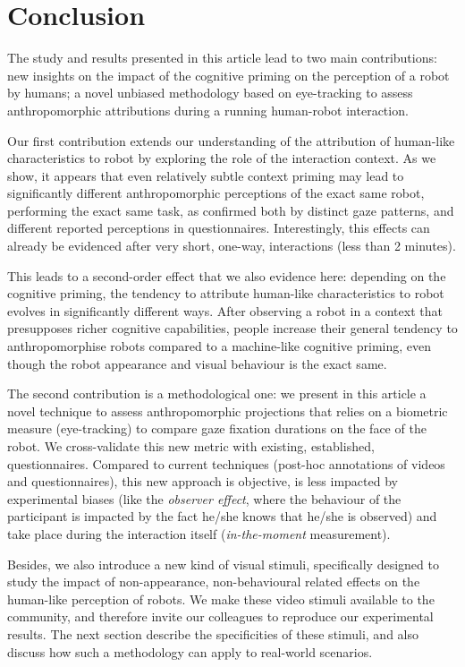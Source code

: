 \documentclass[lettersize, noapacite, twoside, HRI]{apa_HRI}
\begin{document}
\section{Conclusion}

The study and results presented in this article lead to two main contributions:
new insights on the impact of the cognitive priming on the perception of a robot
by humans; a novel unbiased methodology based on eye-tracking to assess
anthropomorphic attributions during a running human-robot interaction.

Our first contribution extends our understanding of the attribution of
human-like characteristics to robot by exploring the role of the interaction
context. As we show, it appears that even relatively subtle context
priming may lead to significantly different anthropomorphic perceptions of
the exact same robot, performing the exact same task, as confirmed both by
distinct gaze patterns, and different reported perceptions in questionnaires.
Interestingly, this effects can already be evidenced after very short,
one-way, interactions (less than 2 minutes).

This leads to a second-order effect that we also evidence here: depending on the
cognitive priming, the tendency to attribute human-like characteristics to robot
evolves in significantly different ways. After observing a robot in a
context that presupposes richer cognitive capabilities, people increase
their general tendency to anthropomorphise robots compared to a machine-like
cognitive priming, even though the robot appearance and visual behaviour is the
exact same.

The second contribution is a methodological one: we present in this article
a novel technique to assess anthropomorphic projections that relies on a
biometric measure (eye-tracking) to compare gaze fixation durations on
the face of the robot. We cross-validate this new metric with existing,
established, questionnaires. Compared to current techniques (post-hoc
annotations of videos and questionnaires), this new approach is objective,
is less impacted by experimental biases (like the \emph{observer effect},
where the behaviour of the participant is impacted by the fact he/she knows that
he/she is observed) and take place during the interaction itself
(\emph{in-the-moment} measurement).

Besides, we also introduce a new kind of visual stimuli, specifically designed
to study the impact of non-appearance, non-behavioural related effects on the
human-like perception of robots. We make these video stimuli available to the
community, and therefore invite our colleagues to reproduce our experimental
results. The next section describe the specificities of these stimuli, and also
discuss how such a methodology can apply to real-world scenarios.
\end{document}
